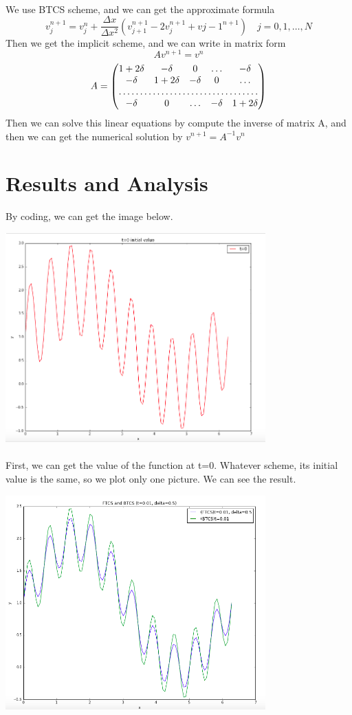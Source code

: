 \documentclass[UTF8]{article}
\begin{document}
\paragraph{}
We use BTCS scheme, and we can get the approximate formula
$$
v_{j}^{n+1} = v_{j}^{n} + \frac{\Delta x}{\Delta x^{2}}(v_{j+1}^{n+1} - 2v_{j}^{n+1} + v{j-1}^{n+1}) \quad j = 0,1,\dots,N
$$
Then we get the implicit scheme, and we can write in matrix form
$$
Av^{n+1} = v^{n}
$$
$$
A =
\begin{pmatrix}
    1+2 \delta & -\delta & 0 & \ldots & -\delta \\
    -\delta & 1+2 \delta & -\delta & 0 & \ldots \\
    \hdotsfor{5} \\
    -\delta & 0 & \ldots & -\delta & 1+2 \delta \\
\end{pmatrix}
$$
Then we can solve this linear equations by compute the inverse of matrix A, and then we can get the numerical solution by $v^{n+1} = A^{-1}v^{n}$
\section{Results and Analysis}
By coding, we can get the image below.

\includegraphics[width=10cm]{1.png}

\paragraph{}
First, we can get the value of the function at t=0. Whatever scheme, its initial value is the same, so we plot only one picture. We can see the result.

\includegraphics[width=10cm]{2.png}
\end{document}
